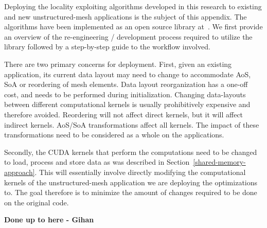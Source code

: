 Deploying the locality exploiting algorithms developed in this research to 
existing and new unstructured-mesh applications is the subject of this appendix. 
The algorithms have been implemented as an open source library 
at~\cite{opt-library}. We first provide an overview of the re-engineering /
development process required to utilize the library followed by a step-by-step 
guide to the workflow involved. 

There are two primary concerns for deployment. First, given an existing 
application, its current data layout may need to change to accommodate AoS, SoA 
or reordering of mesh elements. Data layout reorganization has a one-off cost, and needs to be 
performed during initialization. Changing data-layouts between different 
computational kernels is usually prohibitively expensive and therefore avoided. 
Reordering will not affect direct kernels, but it will affect indirect kernels. 
AoS/SoA transformations affect all kernels. The impact of these transformations 
need to be considered as a whole on the applications. 

Secondly, the CUDA kernels that perform the computations need to be changed to 
load, process and store data as was described in 
Section~\ref{shared-memory-approach}. This will essentially involve directly 
modifying the computational kernels of the unstructured-mesh application we are 
deploying the optimizations to. The goal therefore is to minimize the amount 
of changes required to be done on the original code.

\textbf{Done up to here - Gihan}





